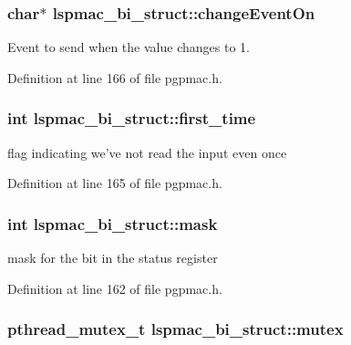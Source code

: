 \hypertarget{structlspmac__bi__struct_ae7178007dfdf21be0e5b1fbaa36732af}{
\subsubsection[{change\-Event\-On}]{\setlength{\rightskip}{0pt plus 5cm}char$\ast$ lspmac\-\_\-bi\-\_\-struct\-::change\-Event\-On}}\label{structlspmac__bi__struct_ae7178007dfdf21be0e5b1fbaa36732af}


Event to send when the value changes to 1. 



Definition at line 166 of file pgpmac.\-h.

\hypertarget{structlspmac__bi__struct_a814978c33dc99e7911faa4ddb12bfd90}{
\subsubsection[{first\-\_\-time}]{\setlength{\rightskip}{0pt plus 5cm}int lspmac\-\_\-bi\-\_\-struct\-::first\-\_\-time}}\label{structlspmac__bi__struct_a814978c33dc99e7911faa4ddb12bfd90}


flag indicating we've not read the input even once 



Definition at line 165 of file pgpmac.\-h.

\hypertarget{structlspmac__bi__struct_ac010058c9883088705059dee1d90ee72}{
\subsubsection[{mask}]{\setlength{\rightskip}{0pt plus 5cm}int lspmac\-\_\-bi\-\_\-struct\-::mask}}\label{structlspmac__bi__struct_ac010058c9883088705059dee1d90ee72}


mask for the bit in the status register 



Definition at line 162 of file pgpmac.\-h.

\hypertarget{structlspmac__bi__struct_a58053a98fa4696b56d674e775b3b4690}{
\subsubsection[{mutex}]{\setlength{\rightskip}{0pt plus 5cm}pthread\-\_\-mutex\-\_\-t lspmac\-\_\-bi\-\_\-struct\-::mutex}}\label{structlspmac__bi__struct_a58053a98fa4696b56d674e775b3b4690}


